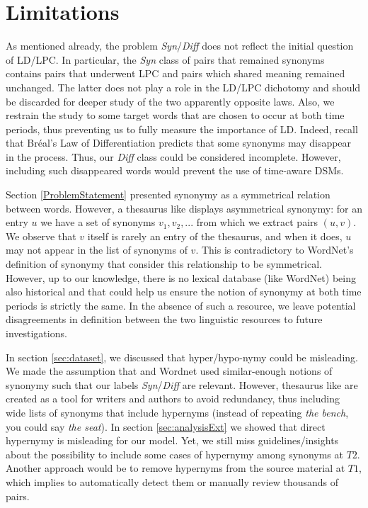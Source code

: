 \documentclass[11pt]{article}
\newcommand{\synOne}{u}%
\newcommand{\synTwo}{v}%
\newcommand{\synpair}{(\synOne,\synTwo)}
\newcommand{\firstTime}{T1}
\newcommand{\secondTime}{T2}
\begin{document}
\section*{Limitations}

As mentioned already, the problem \textit{Syn}/\textit{Diff} does not reflect the initial question of LD/LPC. In particular, the \textit{Syn} class of pairs that remained synonyms contains pairs that underwent LPC and pairs which shared meaning remained unchanged. The latter does not play a role in the LD/LPC dichotomy and should be discarded for deeper study of the two apparently opposite laws. Also, we restrain the study to some target words that are chosen to occur at both time periods, thus preventing us to fully measure the importance of LD. Indeed, recall that Bréal's Law of Differentiation predicts that some synonyms may disappear in the process. Thus, our \textit{Diff} class could be considered incomplete. However, including such disappeared words would prevent the use of time-aware DSMs.

Section \ref{ProblemStatement} presented synonymy as a symmetrical relation between words. However, a thesaurus like \citet{fernald1896english} displays asymmetrical synonymy: for an entry $u$ we have a set of synonyms $v_1,v_2,...$ from which we extract pairs $\synpair$. We observe that $v$ itself is rarely an entry of the thesaurus, and when it does, $u$ may not appear in the list of synonyms of $v$. This is contradictory to WordNet's definition of synonymy that consider this relationship to be symmetrical. However, up to our knowledge, there is no lexical database (like WordNet) being also historical and that could help us ensure the notion of synonymy at both time periods is strictly the same. In the absence of such a resource, we leave potential disagreements in definition between the two linguistic resources to future investigations.


In section \ref{sec:dataset}, we discussed that hyper/hypo-nymy could be misleading. We made the assumption that \citet{fernald1896english} and Wordnet \citep{fellbaum2010wordnet} used similar-enough notions of synonymy such that our labels \textit{Syn}/\textit{Diff} are relevant. However, thesaurus like \citet{fernald1896english} are created as a tool for writers and authors to avoid redundancy, thus including wide lists of synonyms that include hypernyms (instead of repeating \textit{the bench}, you could say \textit{the seat}). In section \ref{sec:analysisExt} we showed that direct hypernymy is misleading for our model. Yet, we still miss guidelines/insights about the possibility to include some cases of hypernymy among synonyms at $\secondTime$. Another approach would be to remove hypernyms from the source material at $\firstTime$, which implies to automatically detect them or manually review thousands of pairs.
\end{document}

